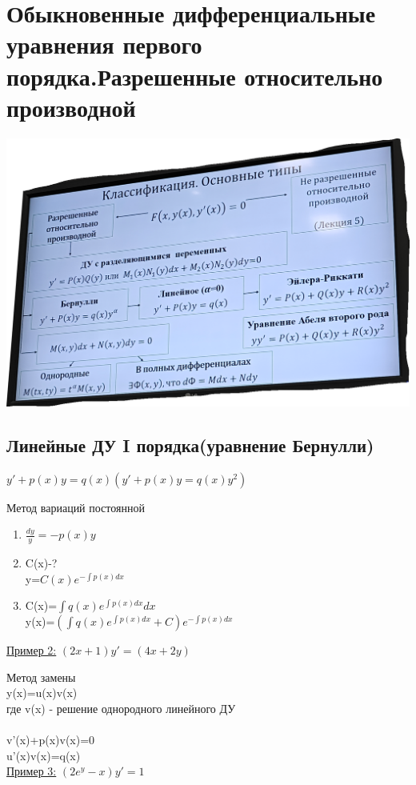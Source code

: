 \documentclass[12pt]{article}
\let\ORIincludegraphics\includegraphics
\renewcommand{\includegraphics}[2][]{\ORIincludegraphics[scale=0.65,#1]{#2}}
\begin{document}
  \section{Обыкновенные дифференциальные уравнения первого порядка.Разрешенные относительно производной}
  \begin{center}
    \includegraphics[scale=0.5]{2.1.1.png}
  \end{center}
  \subsection{Линейные ДУ I порядка(уравнение Бернулли)}
  \begin{center}
    $y'+p(x)y=q(x)(y'+p(x)y=q(x)y^2)$
  \end{center}

  \begin{minipage}{0.48\textwidth}
    Метод вариаций постоянной\\
    \begin{enumerate}
      \item $\frac{dy}{y}=-p(x)y$
      \item C(x)-?\\
      y=$C(x)e^{-\int p(x)dx}$
      \item C(x)=$\int q(x)e^{\int p(x)dx}dx$\\
      y(x)=$(\int q(x)e^{\int p(x)dx}+C)e^{-\int p(x)dx}$
    \end{enumerate}
    \underline{Пример 2:} $(2x+1)y'=(4x+2y)$
  \end{minipage}
    \hfill
  \begin{minipage}{0.48\textwidth}
    Метод замены\\
    y(x)=u(x)v(x)\\ 
    где v(x) - решение однородного линейного ДУ\\
    \\
    v'(x)+p(x)v(x)=0\\
    u'(x)v(x)=q(x)\\
    \underline{Пример 3:} $(2e^y-x)y'=1$
  \end{minipage}
\end{document}
